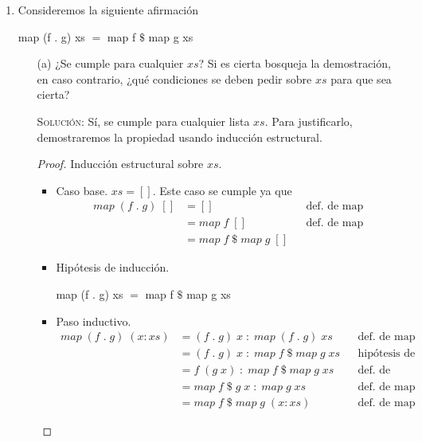 \documentclass[letterpaper,11pt]{article}
\begin{document}
\begin{enumerate}
    \item Consideremos la siguiente afirmación
    \begin{center}
        map (f . g) xs $=$ map f $\$$ map g xs
    \end{center}

    \begin{itemize}
        \item[(a)] ¿Se cumple para cualquier $xs$? Si es cierta bosqueja la 
        demostración, en caso contrario, ¿qué condiciones se deben pedir sobre
        $xs$ para que sea cierta?

        \textsc{Solución:} Sí, se cumple para cualquier lista $xs$.
        Para justificarlo, demostraremos la propiedad usando inducción 
        estructural.

        \begin{proof}
            Inducción estructural sobre $xs$.
            \begin{itemize}
                \item Caso base.
                $xs = []$. Este caso se cumple ya que 
                \begin{align*}
                    map \; (f \; . \; g) \; []
                    &= []
                    && \text{def. de map} \\ 
                    &= map \; f \; []
                    && \text{def. de map} \\ 
                    &= map \; f \; \$ \; map \; g \; []
                \end{align*}

                \item Hipótesis de inducción.
                \begin{center}
                    map (f . g) xs $=$ map f $\$$ map g xs
                \end{center}

                \item Paso inductivo.
                \begin{align*}
                    map \; (f \; . \; g) \; (x:xs)
                    &= (f \; . \; g) \; x \; : \; map \; (f \; . \; g) \; xs
                    && \text{def. de map} \\ 
                    &= (f \; . \; g) \; x \; : \; map \; f \; \$ \; map \; g \; xs
                    && \text{hipótesis de inducción} \\
                    &= f \; (g \; x) \; : \;   map \; f \; \$ \; map \; g \; xs
                    && \text{def. de composición} \\
                    &= map \; f \; \$ \; g \; x \; : \; map \; g \; xs 
                    && \text{def. de map} \\
                    &= map \; f \; \$ \; map \; g \; (x:xs)
                    && \text{def. de map}
                \end{align*}
            \end{itemize}
        \end{proof}


\end{itemize}
\end{enumerate}
\end{document}
